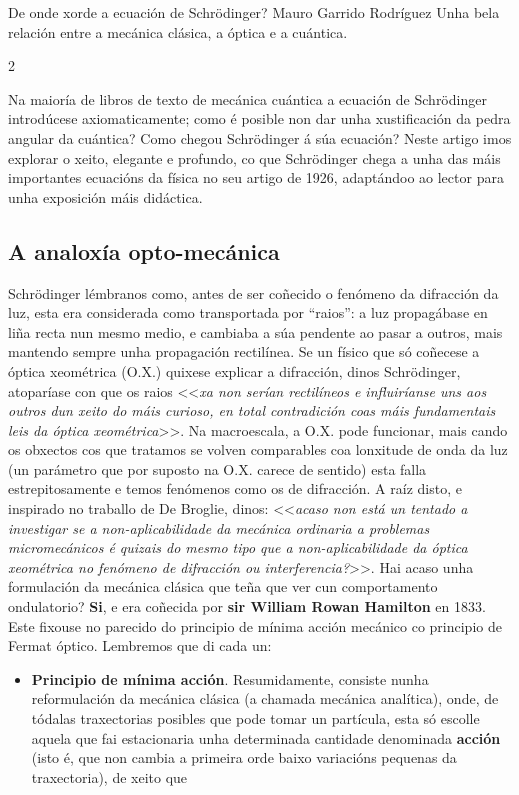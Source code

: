 \Titular*%
{divulgacion}%
{De onde xorde a ecuación de Schrödinger?}%
{Mauro Garrido Rodríguez}%
{Unha bela relación entre a mecánica clásica, a óptica e a cuántica.}%

\begin{multicols}{2}


Na maioría de libros de texto de mecánica cuántica a ecuación de Schrödinger
introdúcese axiomaticamente; como é posible non dar unha xustificación da pedra
angular da cuántica? Como chegou Schrödinger á súa ecuación? Neste artigo imos
explorar o xeito, elegante e profundo, co que Schrödinger chega a unha das máis
importantes ecuacións da física no seu artigo de 1926, adaptándoo ao lector
para unha exposición máis didáctica.

\subsection*{A analoxía opto-mecánica}

Schrödinger lémbranos como, antes de ser coñecido o fenómeno da difracción da
luz, esta era considerada como transportada por ``raios'': a luz propagábase en
liña recta nun mesmo medio, e cambiaba a súa pendente ao pasar a outros, mais
mantendo sempre unha propagación rectilínea. Se un físico que só coñecese a
óptica xeométrica (O.X.) quixese explicar a difracción, dinos Schrödinger,
atoparíase con que os raios <<\textit{xa non serían rectilíneos e influiríanse
uns aos outros dun xeito do máis curioso, en total contradición coas máis
fundamentais leis da óptica xeométrica}>>. Na macroescala, a O.X. pode funcionar,
mais cando os obxectos cos que tratamos se volven comparables coa lonxitude de
onda da luz (un parámetro que por suposto na O.X. carece de sentido) esta falla
estrepitosamente e temos fenómenos como os de difracción. A raíz disto, e
inspirado no traballo de De Broglie, dinos: <<\textit{acaso non está un tentado a
investigar se a non-aplicabilidade da mecánica ordinaria a problemas
micromecánicos é quizais do mesmo tipo que a non-aplicabilidade da óptica
xeométrica no fenómeno de difracción ou interferencia?}>>. Hai acaso unha
formulación da mecánica clásica que teña que ver cun comportamento ondulatorio?
\textbf{Si}, e era coñecida por \textbf{sir William Rowan Hamilton} en 1833.
Este fixouse no parecido do principio de mínima acción mecánico co principio de
Fermat óptico. Lembremos que di cada un:

\begin{itemize}

    \item \textbf{Principio de mínima acción}. Resumidamente, consiste nunha
reformulación da mecánica clásica (a chamada mecánica analítica), onde, de
tódalas traxectorias posibles que pode tomar un partícula, esta só escolle
aquela que fai estacionaria unha determinada cantidade denominada
\textbf{acción} (isto é, que non cambia a primeira orde baixo variacións
pequenas da traxectoria), de xeito que


\end{itemize}
\end{multicols}

